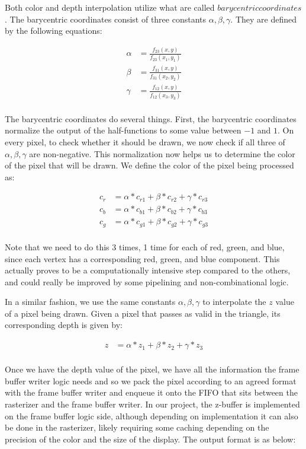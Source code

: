 \documentclass[letterpaper,10pt]{article}
\begin{document}
Both color and depth interpolation utilize what are called $barycentric coordinates$. The barycentric coordinates consist of three constants $\alpha, \beta, \gamma$. They are defined by the following equations:

\begin{align*}
   \alpha &= \frac{f_{23}(x,y)}{f_{23}(x_1,y_1)}   \\
   \beta &= \frac{f_{31}(x,y)}{f_{31}(x_2,y_2)}    \\
   \gamma &= \frac{f_{12}(x,y)}{f_{12}(x_3,y_3)}  \\
\end{align*}

The barycentric coordinates do several things. First, the barycentric coordinates normalize the output of the half-functions to some value between $-1$ and $1$. On every pixel, to check whether it should be drawn, we now check if all three of $\alpha, \beta, \gamma$ are non-negative. This normalization now helps us to determine the color of the pixel that will be drawn. We define the color of the pixel being processed as:

\begin{align*}
    c_{r} &= \alpha*c_{r1} + \beta*c_{r2} + \gamma*c_{r3}					\\
    c_{b} &= \alpha*c_{b1} + \beta*c_{b2} + \gamma*c_{b3}					\\
    c_{g} &= \alpha*c_{g1} + \beta*c_{g2} + \gamma*c_{g3} \\
\end{align*}

Note that we need to do this 3 times, 1 time for each of red, green, and blue, since each vertex has a corresponding red, green, and blue component. This actually proves to be a computationally intensive step compared to the others, and could really be improved by some pipelining and non-combinational logic. 

In a similar fashion, we use the same constants $\alpha, \beta, \gamma$ to interpolate the $z$ value of a pixel being drawn. Given a pixel that passes as valid in the triangle, its corresponding depth is given by:

\begin{align*}
    z &= \alpha*z_{1} + \beta*z_{2} + \gamma*z_{3}					\\
\end{align*}

Once we have the depth value of the pixel, we have all the information the frame buffer writer logic needs and so we pack the pixel according to an agreed format with the frame buffer writer and enqueue it onto the FIFO that sits between the rasterizer and the frame buffer writer. In our project, the z-buffer is implemented on the frame buffer logic side, although depending on implementation it can also be done in the rasterizer, likely requiring some caching depending on the precision of the color and the size of the display. The output format is as below:
\end{document}
